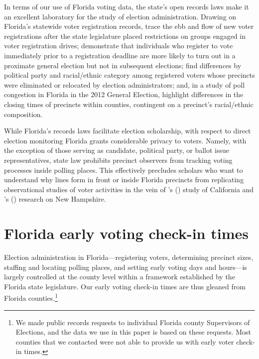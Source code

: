 \documentclass[12pt,titlepage]{article}
\newcommand{\possessivecite}[1]{\citeauthor{#1}'s (\citeyear{#1})}
\begin{document}
In terms of our use of Florida voting data, the state's open records
laws make it an excellent laboratory for the study of election
administration. Drawing on Florida's statewide voter registration
records, \cite{herron_smith2013} trace the ebb and flow of new voter
registrations after the state legislature placed restrictions on
groups engaged in voter registration drives;
\cite{shinosmith:registrationtiming} demonstrate that individuals who
register to vote immediately prior to a registration deadline are more
likely to turn out in a proximate general election but not in
subsequent elections; \cite{amos_etal2017} find differences by
political party and racial/ethnic category among registered voters
whose precincts were eliminated or relocated by election
administrators; and, in a study of poll congestion in Florida in the
2012 General Election, \cite{herronsmith:closingtimes} highlight
differences in the closing times of precincts within counties,
contingent on a precinct's racial/ethnic composition.



While Florida's records laws facilitate election scholarship, with
respect to direct election monitoring Florida grants considerable
privacy to voters. Namely, with the exception of those serving as
candidate, political party, or ballot issue representatives, state law
prohibits precinct observers from tracking voting processes inside
polling places. This effectively precludes scholars who want to
understand why lines form in front or inside Florida precincts from
replicating observational studies of voter activities in the vein of
\possessivecite{spencermarkovits:renege} study of California and
\possessivecite{herronsmith:hanoverstudy} research on New Hampshire.

\section*{Florida early voting check-in times}

Election administration in Florida---registering voters, determining
precinct sizes, staffing and locating polling places, and setting
early voting days and hours---is largely controlled at the county
level within a framework established by the Florida state
legislature. Our early voting check-in times are thus gleaned from
Florida counties.\footnote{We made public records requests to
  individual Florida county Supervisors of Elections, and the data we
  use in this paper is based on these requests.  Most counties that we
  contacted were not able to provide us with early voter check-in
  times.}
\end{document}
